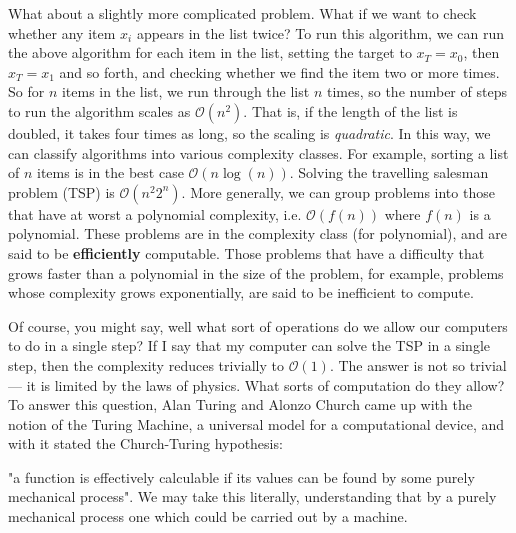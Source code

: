 What about a slightly more complicated problem. What if we want to check whether any item $x_i$ appears
in the list twice? To run this algorithm, we can run the above algorithm for each item in the list, setting the
target to $x_T = x_0$, then $x_T = x_1$ and so forth, and checking whether we find the item two or more
times. So for $n$ items in the list, we run through the list $n$ times, so the number of steps to run
the algorithm scales as $\mathcal{O}(n^2)$. That is, if the length of the list is doubled, it takes
four times as long, so the scaling is \emph{quadratic}.
In this way, we can classify algorithms into various complexity classes. For example, sorting a list
of $n$ items is in the best case $\mathcal{O}(n \log(n))$. Solving the travelling salesman problem (TSP) is
$\mathcal{O}(n^2 2^n)$. More generally, we can group problems into those that have at worst a polynomial
complexity, i.e. $\mathcal{O}\left(f(n)\right)$ where $f(n)$ is a polynomial. These problems are
in the complexity class  (for polynomial), and are said to be \textbf{efficiently} computable.
Those problems that have a difficulty that grows faster than a polynomial in the size of the problem,
for example, problems whose complexity grows exponentially, are said to be inefficient to compute.

Of course, you might say, well what sort of operations do we allow our computers to do in a single step?
If I say that my computer can solve the TSP in a single step, then the complexity reduces trivially to
$\mathcal{O}(1)$. The answer is not so trivial --- it is limited by the laws of physics. What sorts
of computation do they allow? To answer this question, Alan Turing and Alonzo Church came up with the notion of
the Turing Machine, a universal model for a computational device, and with it stated the Church-Turing
hypothesis:

\begin{displayquote}
  "a function is effectively calculable if its values can be found by some purely mechanical process".
  We may take this literally, understanding that by a purely mechanical process one which could be carried out by a machine.
\end{displayquote}

